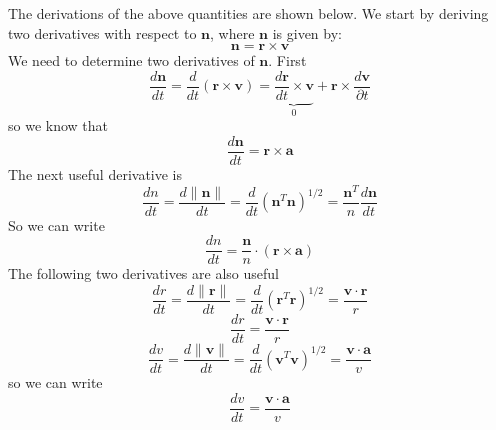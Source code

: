 {The derivations of the above quantities are shown below.  We start
by deriving two derivatives with respect to $\mathbf{n}$, where
$\mathbf{n}$ is given by:
\begin{equation}
    \mathbf{n} =
    \mathbf{r}\times\mathbf{v}
\end{equation}
%
We need to determine two derivatives of $\mathbf{n}$. First
%
\begin{equation}
    \frac{d \mathbf{n}}{dt} = \frac{d }{d
    t}\left(\mathbf{r}\times\mathbf{v}\right) =
    \underbrace{\frac{d \mathbf{r}}{d t} \times\mathbf{v}}_0 +  \mathbf{r} \times
    \frac{d\mathbf{v}}{\partial t}
\end{equation}
%
so we know that
%
\begin{equation}
    \boxed{\frac{d \mathbf{n}}{dt} =   \mathbf{r} \times
    \mathbf{a}}
\end{equation}
%
The next useful derivative is
%
\begin{equation}
    \frac{dn}{dt} = \frac{d  \| \mathbf{n} \|}{dt} = \frac{d }{
    d
    t}\left( \mathbf{n}^T \mathbf{n} \right)^{1/2} =
    \frac{\mathbf{n}^T}{n}\frac{d \mathbf{n}}{dt}
\end{equation}
%
So we can write
%
\begin{equation}
    \boxed{\frac{dn}{dt} =
    \frac{\mathbf{n}}{n}\cdot\left(\mathbf{r}\times\mathbf{a}\right)}
\end{equation}
%
The following two derivatives are also useful
\begin{equation}
    \frac{dr}{dt} = \frac{d  \| \mathbf{r} \|}{dt} =
    \frac{d}{dt}(\mathbf{r}^T\mathbf{r})^{1/2} = \frac{\mathbf{v}  \cdot \mathbf{r} }{r}
\end{equation}
%
\begin{equation}
     \boxed{\frac{dr}{dt} = \frac{\mathbf{v}  \cdot \mathbf{r}
     }{r}}
\end{equation}
%
\begin{equation}
     \frac{dv}{dt} = \frac{d \| \mathbf{v} \|}{dt} = \frac{d}{dt}(\mathbf{v}^T\mathbf{v})^{1/2} = \frac{\mathbf{v}  \cdot \mathbf{a} }{v}
\end{equation}
%
so we can write
\begin{equation}
     \boxed{\frac{dv}{dt} = \frac{\mathbf{v}  \cdot \mathbf{a}
     }{v}}
\end{equation}

}
